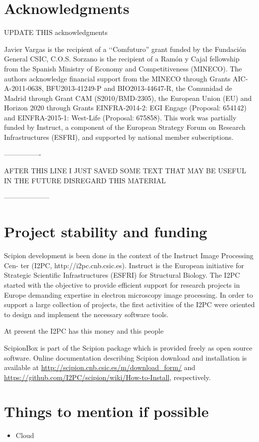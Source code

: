 \section{Acknowledgments}

UPDATE THIS acknowledgments

Javier Vargas is the recipient of a ‘‘Comfuturo” grant funded by
the Fundación General CSIC, C.O.S. Sorzano is the recipient of a
Ramón y Cajal fellowship from the Spanish Ministry of Economy
and Competitiveness (MINECO). The authors acknowledge financial
support from the MINECO through Grants AIC-A-2011-0638,
BFU2013-41249-P and BIO2013-44647-R, the Comunidad de
Madrid through Grant CAM (S2010/BMD-2305), the European
Union (EU) and Horizon 2020 through Grants EINFRA-2014-2:
EGI Engage (Proposal: 654142) and EINFRA-2015-1: West-Life
(Proposal: 675858).
This work was partially funded by Instruct, a component of the
European Strategy Forum on Research Infrastructures (ESFRI), and
supported by national member subscriptions.



----------------

    AFTER THIS LINE I JUST SAVED SOME TEXT THAT MAY BE USEFUL IN THE FUTURE DISREGARD THIS MATERIAL

    --------------------
   


\section{Project stability and funding}


Scipion development is been done in the context of the Instruct Image Processing Cen-
ter (I2PC, http://i2pc.cnb.csic.es). Instruct is the European initiative for Strategic
Scientific Infrastructures (ESFRI) for Structural Biology. The I2PC started with the objective 
to provide efficient support for research projects in Europe demanding expertise in 
electron microscopy image processing. In order to support a large collection
of projects, the first activities of the I2PC were oriented to design and implement the
necessary software tools. 

At present the I2PC has this money and this people

ScipionBox is part of the Scipion package which is provided 
freely as open source software. Online documentation
describing Scipion download and installation is available
at \url{http://scipion.cnb.csic.es/m/download_form/} and \url{https://github.com/I2PC/scipion/wiki/How-to-Install}, respectively.

\section{Things to mention if possible}
\begin{itemize}
 \item Cloud
\end{itemize}
